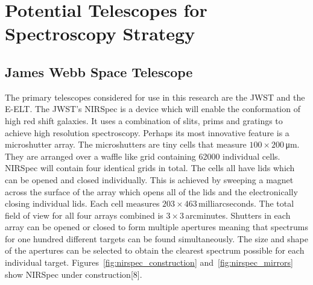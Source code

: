 	\section{Potential Telescopes for Spectroscopy Strategy} %
	\label{sub:candidate_telescopes}
		\subsection{James Webb Space Telescope} %
		\label{ssub:james_webb_space_telescope}
			The primary telescopes considered for use in this research are the JWST and the E-ELT. The JWST’s NIRSpec is a device which will enable the conformation of high red shift galaxies. It uses a combination of slits, prims and gratings to achieve high resolution spectroscopy. Perhaps its most innovative feature is a microshutter array. The microshutters are tiny cells that measure $100 \times 200$\,\si{\micro\metre}. They are arranged over a waffle like grid containing \num{62000} individual cells. NIRSpec will contain four identical grids in total. The cells all have lids which can be opened and closed individually. This is achieved by sweeping a magnet across the surface of the array which opens all of the lids and the electronically closing individual lids. Each cell measures $203 \times 463$\,milliarcseconds. The total field of view for all four arrays combined is $3 \times 3$\,arcminutes. Shutters in each array can be opened or closed to form multiple apertures meaning that spectrums for one hundred different targets can be found simultaneously. The size and shape of the apertures can be selected to obtain the clearest spectrum possible for each individual target. Figures~\ref{fig:nirspec_construction} and~\ref{fig:nirspec_mirrors} show NIRSpec under construction\cite{JWSTPrimer}[8].
